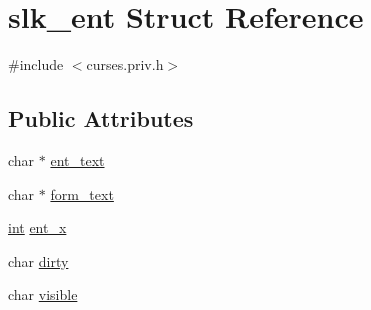 \hypertarget{structslk__ent}{\section{slk\-\_\-ent Struct Reference}
\label{structslk__ent}
}


{\ttfamily \#include $<$curses.\-priv.\-h$>$}

\subsection*{Public Attributes}
\begin{DoxyCompactItemize}
\item 
char $\ast$ \hyperlink{structslk__ent_ab973d77f67247b291b45bb72c0987778}{ent\-\_\-text}
\item 
char $\ast$ \hyperlink{structslk__ent_a4b5515aa33e05c6a6ab9765c41f9fe65}{form\-\_\-text}
\item 
\hyperlink{term__entry_8h_ad65b480f8c8270356b45a9890f6499ae}{int} \hyperlink{structslk__ent_a41420850f35d2f310f7ac1c5bfdd35f5}{ent\-\_\-x}
\item 
char \hyperlink{structslk__ent_add425867e81f2b0b9b73d23e74aa6fa2}{dirty}
\item 
char \hyperlink{structslk__ent_a6fdb5301f9f20971c4eda620e39b692a}{visible}
\end{DoxyCompactItemize}


